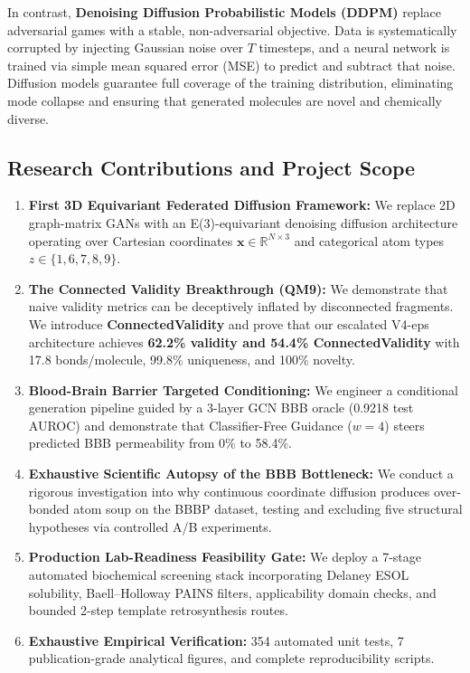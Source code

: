 \documentclass[12pt, a4paper]{article}
\begin{document}
In contrast, \textbf{Denoising Diffusion Probabilistic Models (DDPM)} \cite{ho2020denoising} replace adversarial games with a stable, non-adversarial objective. Data is systematically corrupted by injecting Gaussian noise over $T$ timesteps, and a neural network is trained via simple mean squared error (MSE) to predict and subtract that noise. Diffusion models guarantee full coverage of the training distribution, eliminating mode collapse and ensuring that generated molecules are novel and chemically diverse.

\subsection{Research Contributions and Project Scope}
\begin{enumerate}[leftmargin=*]
    \item \textbf{First 3D Equivariant Federated Diffusion Framework:} We replace 2D graph-matrix GANs with an E(3)-equivariant denoising diffusion architecture operating over Cartesian coordinates $\mathbf{x} \in \mathbb{R}^{N \times 3}$ and categorical atom types $z \in \{1, 6, 7, 8, 9\}$.
    \item \textbf{The Connected Validity Breakthrough (QM9):} We demonstrate that naive validity metrics can be deceptively inflated by disconnected fragments. We introduce \textbf{ConnectedValidity} and prove that our escalated V4-eps architecture achieves \textbf{62.2\% validity and 54.4\% ConnectedValidity} with 17.8 bonds/molecule, 99.8\% uniqueness, and 100\% novelty.
    \item \textbf{Blood-Brain Barrier Targeted Conditioning:} We engineer a conditional generation pipeline guided by a 3-layer GCN BBB oracle (0.9218 test AUROC) and demonstrate that Classifier-Free Guidance ($w=4$) steers predicted BBB permeability from 0\% to 58.4\%.
    \item \textbf{Exhaustive Scientific Autopsy of the BBB Bottleneck:} We conduct a rigorous investigation into why continuous coordinate diffusion produces over-bonded atom soup on the BBBP dataset, testing and excluding five structural hypotheses via controlled A/B experiments.
    \item \textbf{Production Lab-Readiness Feasibility Gate:} We deploy a 7-stage automated biochemical screening stack incorporating Delaney ESOL solubility, Baell--Holloway PAINS filters, applicability domain checks, and bounded 2-step template retrosynthesis routes.
    \item \textbf{Exhaustive Empirical Verification:} 354 automated unit tests, 7 publication-grade analytical figures, and complete reproducibility scripts.
\end{enumerate}
\end{document}
